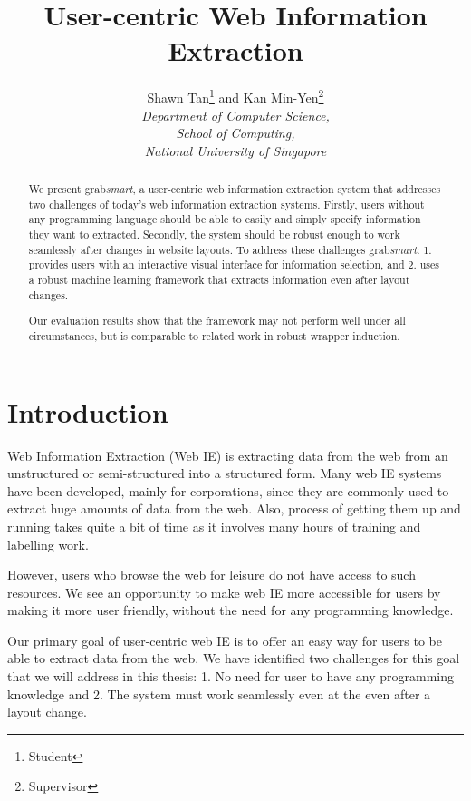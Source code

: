 \documentclass[a4paper,12pt]{nurop}
\begin{document}
\title{User-centric Web Information Extraction}

\author{\large{Shawn Tan}\footnote{Student} and \large{Kan Min-Yen}\footnote{Supervisor}\\
	\normalsize\textit{Department of Computer Science,\\
	School of Computing,\\
	National University of Singapore} 
}
\maketitle

\begin{abstract}
We present grab\textit{smart}, a user-centric web information extraction system that
addresses two challenges of today's web information extraction systems. Firstly, users
without any programming language should be able to easily and simply specify information
they want to extracted. Secondly, the system should be robust enough to work seamlessly
after changes in website layouts. To address these challenges grab\textit{smart}: 1.
provides users with an interactive visual interface for information selection, and 2.
uses a robust machine learning framework that extracts information even after layout changes.

Our evaluation results show that the framework may not perform well under all circumstances,
but is comparable to related work in robust wrapper induction.
\end{abstract}

\section{Introduction}
Web Information Extraction (Web IE) is extracting data from the web from an unstructured or
semi-structured into a structured form. Many web IE systems have been developed, mainly for
corporations, since they are commonly used to extract huge amounts of data from the web.
Also, process of getting them up and running takes quite a bit of time as it involves many
hours of training and labelling work.

However, users who browse the web for leisure do not have access to such resources.
We see an opportunity to make web IE more accessible for users by making it more user friendly,
without the need for any programming knowledge.

Our primary goal of user-centric web IE is to offer an easy way for users to be able to extract
data from the web. We have identified two challenges for this goal that we will address in this
thesis: 1. No need for user to have any programming knowledge and 2. The system must work seamlessly even at the 
even after a layout change.
\end{document}
